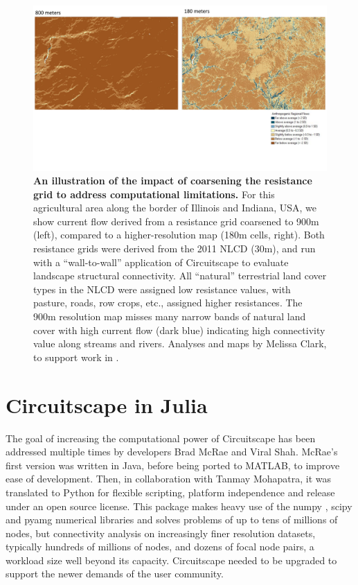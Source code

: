 \documentclass{juliacon}
\begin{document}
\begin{figure}
    \centering
    \includegraphics[width=\textwidth]{res.pdf}
    \caption{\textbf{An illustration of the impact of coarsening the resistance grid to address computational limitations.}  For this agricultural area along the border of Illinois and Indiana, USA, we show current flow derived from a resistance grid coarsened to 900m (left), compared to a higher-resolution map (180m cells, right).  Both resistance grids were derived from the 2011 NLCD (30m), and run with a “wall-to-wall” application of Circuitscape to evaluate landscape structural connectivity.  All “natural” terrestrial land cover types in the NLCD were assigned low resistance values, with pasture, roads, row crops, etc., assigned higher resistances. The 900m resolution map misses many narrow bands of natural land cover with high current flow (dark blue) indicating high connectivity value along streams and rivers. Analyses and maps by Melissa Clark, to support work in \cite{baldwin2018future}. 
}
    \label{fig:my_label}
\end{figure}



\section{Circuitscape in Julia}
\label{sec:documentclass}
%
The goal of increasing the computational power of Circuitscape has been addressed multiple times by developers Brad McRae and Viral Shah.  McRae’s first version was written in Java, before being ported to MATLAB, to improve ease of development. Then, in collaboration with Tanmay Mohapatra, it was translated to Python for flexible scripting, platform independence and release under an open source license. This package makes heavy use of the numpy \cite{van2011numpy}, scipy \cite{jones2014scipy} and pyamg \cite{bell2015pyamg} numerical libraries and solves problems of up to tens of millions of nodes, but connectivity analysis on increasingly finer resolution datasets, typically hundreds of millions of nodes, and dozens of focal node pairs, a workload size well beyond its capacity. Circuitscape needed to be upgraded to support the newer demands of the user community. 
\end{document}
